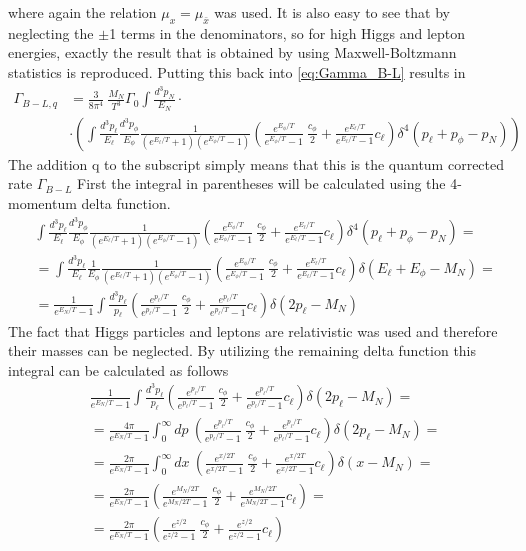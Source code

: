 where again the relation $\mu_x=\mu_{\bar{x}}$ was used. \newline
It is also easy to see that by neglecting the $\pm$1 terms in the denominators, so for high Higgs and lepton energies, exactly the result that is obtained by using Maxwell-Boltzmann statistics is reproduced. \newline
Putting this back into \ref{eq:Gamma_B-L} results in
\begin{align*}
	\Gamma_{B-L,q}&=\frac{3}{8\pi^4}\:\frac{M_N}{T^3}\Gamma_0\int \frac{d^3p_N}{E_N}\cdot\\
	&\cdot\left(\int\frac{d^3p_\ell}{E_\ell}\frac{d^3p_\phi}{E_\phi}\frac{1}{\left(e^{E_\ell/T}+1\right)\left(e^{E_\phi/T}-1\right)}\left(\frac{e^{E_\phi/T}}{e^{E_\phi/T}-1}\:\frac{c_\phi}{2}+\frac{e^{E_\ell/T}}{e^{E_\ell/T}-1}c_\ell\right)\delta^4\left(p_\ell+p_\phi-p_N\right)\right)
\end{align*} 
The addition q to the subscript simply means that this is the quantum corrected rate $\Gamma_{B-L}$
First the integral in parentheses will be calculated using the 4-momentum delta function.
\begin{align*}
	&\int\frac{d^3p_\ell}{E_\ell}\frac{d^3p_\phi}{E_\phi}\frac{1}{\left(e^{E_\ell/T}+1\right)\left(e^{E_\phi/T}-1\right)}\left(\frac{e^{E_\phi/T}}{e^{E_\phi/T}-1}\:\frac{c_\phi}{2}+\frac{e^{E_\ell/T}}{e^{E_\ell/T}-1}c_\ell\right)\delta^4\left(p_\ell+p_\phi-p_N\right)=\\
	&=\int\frac{d^3p_\ell}{E_\ell}\frac{1}{E_\phi}\frac{1}{\left(e^{E_\ell/T}+1\right)\left(e^{E_\phi/T}-1\right)}\left(\frac{e^{E_\phi/T}}{e^{E_\phi/T}-1}\:\frac{c_\phi}{2}+\frac{e^{E_\ell/T}}{e^{E_\ell/T}-1}c_\ell\right)\delta\left(E_\ell+E_\phi-M_N\right)=\\
	&=\frac{1}{e^{E_N/T}-1}\int\frac{d^3p_\ell}{p_\ell}\left(\frac{e^{p_\ell/T}}{e^{p_\ell/T}-1}\:\frac{c_\phi}{2}+\frac{e^{p_\ell/T}}{e^{p_\ell/T}-1}c_\ell\right)\delta\left(2p_\ell-M_N\right)
\end{align*}
The fact that Higgs particles and leptons are relativistic was used and therefore their masses can be neglected. By utilizing the remaining delta function this integral can be calculated as follows 
\begin{align*}
&\frac{1}{e^{E_N/T}-1}\int\frac{d^3p_\ell}{p_\ell}\left(\frac{e^{p_\ell/T}}{e^{p_\ell/T}-1}\:\frac{c_\phi}{2}+\frac{e^{p_\ell/T}}{e^{p_\ell/T}-1}c_\ell\right)\delta\left(2p_\ell-M_N\right)=\\
&=\frac{4\pi}{e^{E_N/T}-1}\int_0^\infty dp\:\left(\frac{e^{p_\ell/T}}{e^{p_\ell/T}-1}\:\frac{c_\phi}{2}+\frac{e^{p_\ell/T}}{e^{p_\ell/T}-1}c_\ell\right)\delta\left(2p_\ell-M_N\right)=\\
&=\frac{2\pi}{e^{E_N/T}-1}\int_0^\infty dx\:\left(\frac{e^{x/2T}}{e^{x/2T}-1}\:\frac{c_\phi}{2}+\frac{e^{x/2T}}{e^{x/2T}-1}c_\ell\right)\delta\left(x-M_N\right)=\\
&=\frac{2\pi}{e^{E_N/T}-1}\left(\frac{e^{M_N/2T}}{e^{M_N/2T}-1}\:\frac{c_\phi}{2}+\frac{e^{M_N/2T}}{e^{M_N/2T}-1}c_\ell\right)=\\
&=\frac{2\pi}{e^{E_N/T}-1}\left(\frac{e^{z/2}}{e^{z/2}-1}\:\frac{c_\phi}{2}+\frac{e^{z/2}}{e^{z/2}-1}c_\ell\right)
\end{align*}
